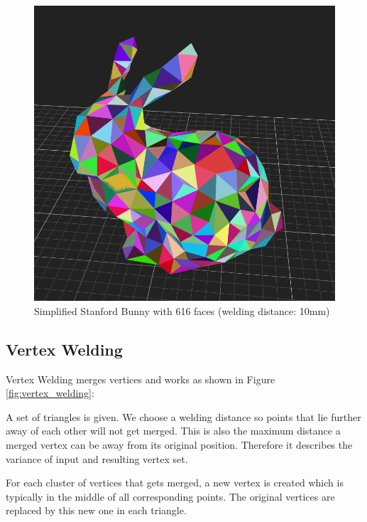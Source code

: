 \documentclass[../ClassicThesis.tex]{subfiles}
\begin{document}
\begin{figure}
\includegraphics[width=0.8\columnwidth]{Images/04-approx-welding-rabbit-10mm.png}
\caption{Simplified Stanford Bunny with 616 faces (welding distance: 10mm)}
\label{fig:10mmBunny}
\end{figure}




\subsection{Vertex Welding}
\label{sec:vertex_welding}










Vertex Welding merges vertices and works as shown in Figure \ref{fig:vertex_welding}: 

A set of triangles is given. We choose a welding distance so points that lie further away of each other will not get merged. This is also the maximum distance a merged vertex can be away from its original position. Therefore it describes the variance of input and resulting vertex set. 

For each cluster of vertices that gets merged, a new vertex is created which is typically in the middle of all corresponding points. The original vertices are replaced by this new one in each triangle.
\end{document}
